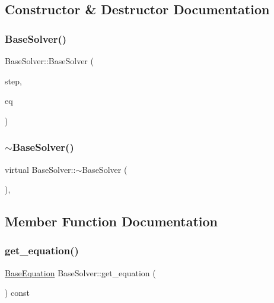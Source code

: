 \subsection{Constructor \& Destructor Documentation}
\mbox{\label{classBaseSolver_a67dba5908628ed3dd89735d9e4c4a436}} 
\subsubsection{\texorpdfstring{Base\+Solver()}{BaseSolver()}}
{\footnotesize\ttfamily Base\+Solver\+::\+Base\+Solver (\begin{DoxyParamCaption}\item[{double}]{step,  }\item[{const \hyperlink{classBaseEquation}{Base\+Equation} \&}]{eq }\end{DoxyParamCaption})}

\mbox{\label{classBaseSolver_aeda8cb9b2995ef1720d0e48abfa645d1}} 
\subsubsection{\texorpdfstring{$\sim$\+Base\+Solver()}{~BaseSolver()}}
{\footnotesize\ttfamily virtual Base\+Solver\+::$\sim$\+Base\+Solver (\begin{DoxyParamCaption}{ }\end{DoxyParamCaption})\hspace{0.3cm}{\ttfamily [virtual]}, {\ttfamily [default]}}



\subsection{Member Function Documentation}
\mbox{\label{classBaseSolver_ad23f3587017d0fdcca0620440a2d2ef6}} 
\subsubsection{\texorpdfstring{get\+\_\+equation()}{get\_equation()}}
{\footnotesize\ttfamily \hyperlink{classBaseEquation}{Base\+Equation} Base\+Solver\+::get\+\_\+equation (\begin{DoxyParamCaption}{ }\end{DoxyParamCaption}) const\hspace{0.3cm}{\ttfamily [inline]}}

